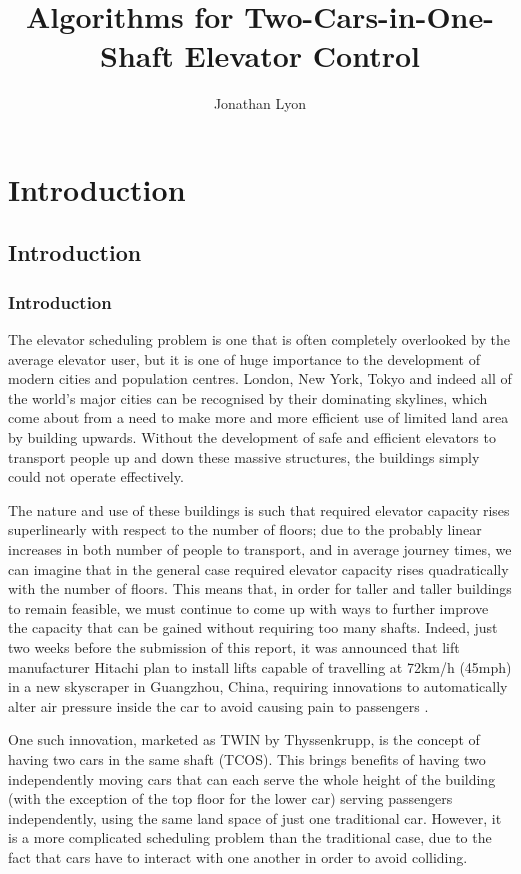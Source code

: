 \documentclass{UoYCSproject}
\author{Jonathan Lyon}
\title{Algorithms for Two-Cars-in-One-Shaft Elevator Control}
\begin{document}
\renewcommand{\thepage}{\roman{page}}
\maketitle 

\setcounter{page}{0}
\part{Introduction}
\renewcommand{\thepage}{\arabic{page}}

\chapter{Introduction}

\section{Introduction}

The elevator scheduling problem is one that is often completely overlooked by the average elevator user, but it is one of huge importance to the development of modern cities and population centres.  London, New York, Tokyo and indeed all of the world's major cities can be recognised by their dominating skylines, which come about from a need to make more and more efficient use of limited land area by building upwards.  Without the development of safe and efficient elevators to transport people up and down these massive structures, the buildings simply could not operate effectively.

The nature and use of these buildings is such that required elevator capacity rises superlinearly with respect to the number of floors; due to the probably linear increases in both number of people to transport, and in average journey times, we can imagine that in the general case required elevator capacity rises quadratically with the number of floors.  This means that, in order for taller and taller buildings to remain feasible, we must continue to come up with ways to further improve the capacity that can be gained without requiring too many shafts.  Indeed, just two weeks before the submission of this report, it was announced that lift manufacturer Hitachi plan to install lifts capable of travelling at 72km/h (45mph) in a new skyscraper in Guangzhou, China, requiring innovations to automatically alter air pressure inside the car to avoid causing pain to passengers \citep{BBC2014}.

One such innovation, marketed as TWIN by Thyssenkrupp, is the concept of having two cars in the same shaft (TCOS).  This brings benefits of having two independently moving cars that can each serve the whole height of the building (with the exception of the top floor for the lower car) serving passengers independently, using the same land space of just one traditional car.  However, it is a more complicated scheduling problem than the traditional case, due to the fact that cars have to interact with one another in order to avoid colliding.
\end{document}
